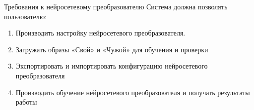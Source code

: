\begin{frame}{Требования к нейросетевому преобразователю}
    Система должна позволять пользователю:
    \begin{enumerate}
        \item Производить настройку нейросетевого преобразователя.
        \item Загружать образы «Свой» и «Чужой» для обучения и проверки
        \item Экспортировать и импортировать конфигурацию нейросетевого преобразователя
        \item Производить обучение нейросетевого преобразователя и получать результаты работы
	\end{enumerate}
\end{frame}
